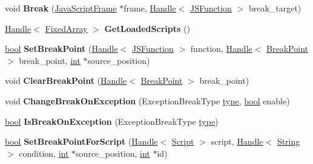\begin{DoxyCompactItemize}
void {\bfseries Break} (\mbox{\hyperlink{classv8_1_1internal_1_1JavaScriptFrame}{Java\+Script\+Frame}} $\ast$frame, \mbox{\hyperlink{classv8_1_1internal_1_1Handle}{Handle}}$<$ \mbox{\hyperlink{classv8_1_1internal_1_1JSFunction}{J\+S\+Function}} $>$ break\+\_\+target)
\item 
\mbox{\label{classv8_1_1internal_1_1Debug_aede9b294a7515c5c79e3b3c53ac1706e}} 
\mbox{\hyperlink{classv8_1_1internal_1_1Handle}{Handle}}$<$ \mbox{\hyperlink{classv8_1_1internal_1_1FixedArray}{Fixed\+Array}} $>$ {\bfseries Get\+Loaded\+Scripts} ()
\item 
\mbox{\label{classv8_1_1internal_1_1Debug_a365d0ffc5bf6f9c7101c19f6ef83c4c4}} 
\mbox{\hyperlink{classbool}{bool}} {\bfseries Set\+Break\+Point} (\mbox{\hyperlink{classv8_1_1internal_1_1Handle}{Handle}}$<$ \mbox{\hyperlink{classv8_1_1internal_1_1JSFunction}{J\+S\+Function}} $>$ function, \mbox{\hyperlink{classv8_1_1internal_1_1Handle}{Handle}}$<$ \mbox{\hyperlink{classv8_1_1internal_1_1BreakPoint}{Break\+Point}} $>$ break\+\_\+point, \mbox{\hyperlink{classint}{int}} $\ast$source\+\_\+position)
\item 
\mbox{\label{classv8_1_1internal_1_1Debug_af04095651ccf171de9cecd0552378a6f}} 
void {\bfseries Clear\+Break\+Point} (\mbox{\hyperlink{classv8_1_1internal_1_1Handle}{Handle}}$<$ \mbox{\hyperlink{classv8_1_1internal_1_1BreakPoint}{Break\+Point}} $>$ break\+\_\+point)
\item 
\mbox{\label{classv8_1_1internal_1_1Debug_a7bee600841fe83a2dc539856cbfe5ec6}} 
void {\bfseries Change\+Break\+On\+Exception} (Exception\+Break\+Type \mbox{\hyperlink{classstd_1_1conditional_1_1type}{type}}, \mbox{\hyperlink{classbool}{bool}} enable)
\item 
\mbox{\label{classv8_1_1internal_1_1Debug_aea86b5daed3f01383f1a0ee2330a466e}} 
\mbox{\hyperlink{classbool}{bool}} {\bfseries Is\+Break\+On\+Exception} (Exception\+Break\+Type \mbox{\hyperlink{classstd_1_1conditional_1_1type}{type}})
\item 
\mbox{\label{classv8_1_1internal_1_1Debug_a2f4faf32dbc53158d7bd89f84a3087ef}} 
\mbox{\hyperlink{classbool}{bool}} {\bfseries Set\+Break\+Point\+For\+Script} (\mbox{\hyperlink{classv8_1_1internal_1_1Handle}{Handle}}$<$ \mbox{\hyperlink{classv8_1_1internal_1_1Script}{Script}} $>$ script, \mbox{\hyperlink{classv8_1_1internal_1_1Handle}{Handle}}$<$ \mbox{\hyperlink{classv8_1_1internal_1_1String}{String}} $>$ condition, \mbox{\hyperlink{classint}{int}} $\ast$source\+\_\+position, \mbox{\hyperlink{classint}{int}} $\ast$id)

\end{DoxyCompactItemize}
